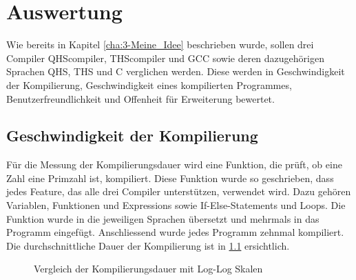 \chapter{Auswertung}
Wie bereits in Kapitel \ref{cha:3-Meine_Idee} beschrieben wurde, sollen drei Compiler QHScompiler, THScompiler und GCC sowie deren dazugehörigen Sprachen QHS, THS und C verglichen werden.
Diese werden in Geschwindigkeit der Kompilierung, Geschwindigkeit eines kompilierten Programmes, Benutzerfreundlichkeit und Offenheit für Erweiterung bewertet. 

\section{Geschwindigkeit der Kompilierung} \label{sec:compare-compilespeed}
Für die Messung der Kompilierungsdauer wird eine Funktion, die prüft, ob eine Zahl eine Primzahl ist, kompiliert. Diese Funktion wurde so geschrieben, dass jedes Feature, das alle drei Compiler unterstützen, verwendet wird.
Dazu gehören Variablen, Funktionen und Expressions sowie If-Else-Statements und Loops. Die Funktion wurde in die jeweiligen Sprachen übersetzt und mehrmals in das Programm eingefügt. Anschliessend wurde jedes Programm zehnmal kompiliert.
Die durchschnittliche Dauer der Kompilierung ist in \ref{fig:compilespeed} ersichtlich.

\begin{figure}[h!]
\centering
\label{fig:compilespeed}
\caption{Vergleich der Kompilierungsdauer mit Log-Log Skalen}
\end{figure}

